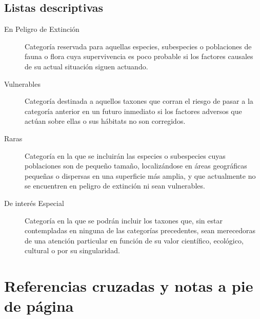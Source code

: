 \documentclass[11pt,a4paper]{report}
\begin{document}
\section{Listas descriptivas}


\begin{description}
\item[En Peligro de Extinción]
Categoría reservada para aquellas especies, subespecies o poblaciones de fauna o flora cuya supervivencia es poco probable si los factores causales de su actual situación siguen actuando.

\item[Vulnerables]
Categoría destinada a aquellos taxones que corran el riesgo de pasar a la categoría anterior en un futuro inmediato si los factores adversos que actúan sobre ellas o sus hábitats no son corregidos.

\item[Raras]
Categoría en la que se incluirán las especies o subespecies cuyas poblaciones son de pequeño tamaño, localizándose en áreas geográficas pequeñas o dispersas en una superficie más amplia, y que actualmente no se encuentren en peligro de extinción ni sean vulnerables.

\item[De interés Especial]
Categoría en la que se podrán incluir los taxones que, sin estar contempladas en ninguna de las categorías precedentes, sean merecedoras de una atención particular en función de su valor científico, ecológico, cultural o por su singularidad.
\end{description}



\chapter{Referencias cruzadas y notas a pie de página}


\end{document}
